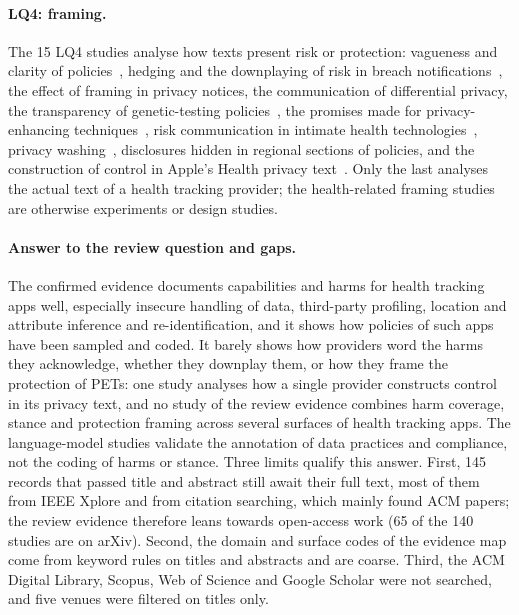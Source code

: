 \paragraph{LQ4: framing.} The 15 LQ4 studies analyse how texts present risk or
protection: vagueness and clarity of policies~\parencite{lebanoff2018automatic},
hedging and the downplaying of risk in breach
notifications~\parencite{zou2019might}, the effect of framing in privacy notices,
the communication of differential privacy, the transparency of genetic-testing
policies~\parencite{doan2024transparency}, the promises made for
privacy-enhancing techniques~\parencite{martin2025cookies}, risk communication
in intimate health technologies~\parencite{moniz2025toward}, privacy
washing~\parencite{brackin2026privacy}, disclosures hidden in regional sections
of policies, and the construction of control in Apple's Health privacy
text~\parencite{serttas2026bounded}. Only the last analyses the actual text of a
health tracking provider; the health-related framing studies are otherwise
experiments or design studies.

\paragraph{Answer to the review question and gaps.} The confirmed evidence
documents capabilities and harms for health tracking apps well, especially
insecure handling of data, third-party profiling, location and attribute
inference and re-identification, and it shows how policies of such apps have
been sampled and coded. It barely shows how providers word the harms they
acknowledge, whether they downplay them, or how they frame the protection of
PETs: one study analyses how a single provider constructs control in its privacy
text, and no study of the review evidence combines harm coverage, stance and
protection framing across several surfaces of health tracking apps. The
language-model studies validate the annotation of data practices and
compliance, not the coding of harms or stance. Three limits qualify this
answer. First, 145 records that passed title and abstract still await their
full text, most of them from IEEE Xplore and from citation searching, which
mainly found ACM papers; the review evidence therefore leans towards open-access
work (65 of the 140 studies are on arXiv). Second, the domain and surface codes
of the evidence map come from keyword rules on titles and abstracts and are
coarse. Third, the ACM Digital Library, Scopus, Web of Science and Google
Scholar were not searched, and five venues were filtered on titles only.
